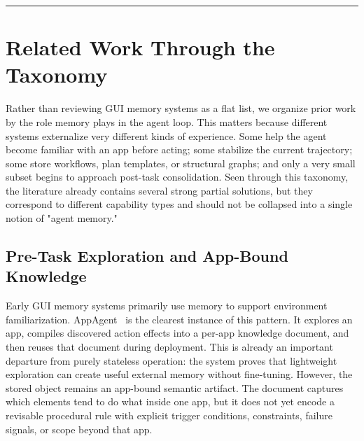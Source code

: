 \documentclass{article}
\begin{document}
\begin{center}\rule{0.5\linewidth}{0.5pt}\end{center}

\section{Related Work Through the
Taxonomy}\label{5-related-work-through-the-taxonomy}

Rather than reviewing GUI memory systems as a flat list, we organize
prior work by the role memory plays in the agent loop. This matters
because different systems externalize very different kinds of
experience. Some help the agent become familiar with an app before
acting; some stabilize the current trajectory; some store workflows,
plan templates, or structural graphs; and only a very small subset
begins to approach post-task consolidation. Seen through this taxonomy,
the literature already contains several strong partial solutions, but
they correspond to different capability types and should not be
collapsed into a single notion of "agent memory."

\subsection{Pre-Task Exploration and App-Bound
Knowledge}\label{51-pre-task-exploration-and-app-bound-knowledge}

Early GUI memory systems primarily use memory to support environment
familiarization. AppAgent~\parencite{zhang2023appagent} is the clearest
instance of this pattern. It explores an app, compiles discovered
action effects into a per-app knowledge document, and then reuses that
document during deployment. This is already an important departure from
purely stateless operation: the system proves that lightweight
exploration can create useful external memory without fine-tuning.
However, the stored object remains an app-bound semantic artifact. The
document captures which elements tend to do what inside one app, but it
does not yet encode a revisable procedural rule with explicit trigger
conditions, constraints, failure signals, or scope beyond that app.
\end{document}
